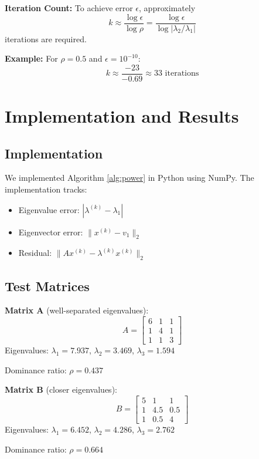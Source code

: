 \documentclass[11pt,twocolumn]{article}
\begin{document}
\textbf{Iteration Count:} To achieve error $\epsilon$, approximately
\begin{equation}
k \approx \frac{\log \epsilon}{\log \rho} = \frac{\log \epsilon}{\log |\lambda_2/\lambda_1|}
\end{equation}
iterations are required.

\textbf{Example:} For $\rho = 0.5$ and $\epsilon = 10^{-10}$:
$$k \approx \frac{-23}{-0.69} \approx 33 \text{ iterations}$$

\section{Implementation and Results}

\subsection{Implementation}

We implemented Algorithm \ref{alg:power} in Python using NumPy. The implementation tracks:
\begin{itemize}
\item Eigenvalue error: $|\lambda^{(k)} - \lambda_1|$
\item Eigenvector error: $\|x^{(k)} - v_1\|_2$
\item Residual: $\|Ax^{(k)} - \lambda^{(k)} x^{(k)}\|_2$
\end{itemize}

\subsection{Test Matrices}

\textbf{Matrix A} (well-separated eigenvalues):
$$A = \begin{bmatrix} 6 & 1 & 1 \\ 1 & 4 & 1 \\ 1 & 1 & 3 \end{bmatrix}$$
Eigenvalues: $\lambda_1 = 7.937$, $\lambda_2 = 3.469$, $\lambda_3 = 1.594$

Dominance ratio: $\rho = 0.437$

\textbf{Matrix B} (closer eigenvalues):
$$B = \begin{bmatrix} 5 & 1 & 1 \\ 1 & 4.5 & 0.5 \\ 1 & 0.5 & 4 \end{bmatrix}$$
Eigenvalues: $\lambda_1 = 6.452$, $\lambda_2 = 4.286$, $\lambda_3 = 2.762$

Dominance ratio: $\rho = 0.664$
\end{document}
